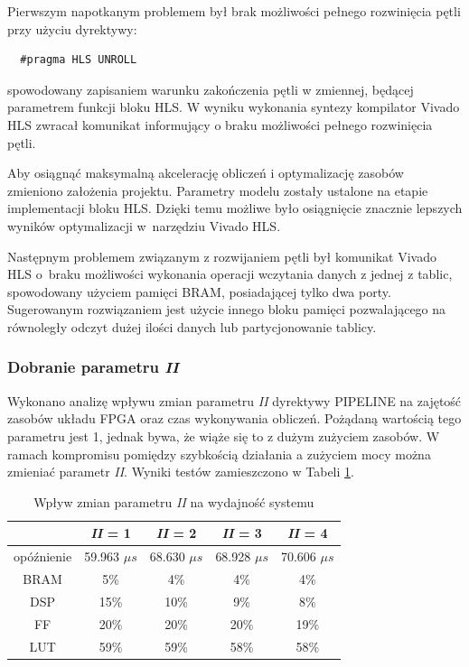 Pierwszym napotkanym problemem był brak możliwości pełnego rozwinięcia pętli przy użyciu dyrektywy:
\begin{verbatim}
  #pragma HLS UNROLL
\end{verbatim}
spowodowany zapisaniem warunku zakończenia pętli w zmiennej, będącej parametrem funkcji bloku HLS. 
W wyniku wykonania syntezy kompilator Vivado HLS zwracał komunikat informujący o braku możliwości pełnego rozwinięcia pętli.

Aby osiągnąć maksymalną akcelerację obliczeń i optymalizację zasobów zmieniono założenia projektu. Parametry modelu zostały ustalone na etapie implementacji bloku HLS. Dzięki temu możliwe było osiągnięcie znacznie lepszych wyników optymalizacji w~narzędziu Vivado HLS.

Następnym problemem związanym z rozwijaniem pętli był komunikat Vivado HLS o~braku możliwości wykonania operacji wczytania danych z jednej z tablic, spowodowany użyciem pamięci BRAM, posiadającej tylko dwa porty. Sugerowanym rozwiązaniem jest użycie innego bloku pamięci pozwalającego na równoległy odczyt dużej ilości danych lub partycjonowanie tablicy.

\subsubsection{Dobranie parametru \emph{II}}

Wykonano analizę wpływu zmian parametru \emph{II} dyrektywy PIPELINE na zajętość zasobów układu FPGA oraz czas wykonywania obliczeń. Pożądaną wartością tego parametru jest 1, jednak bywa, że wiąże się to z dużym zużyciem zasobów. W ramach kompromisu pomiędzy szybkością działania a zużyciem mocy można zmieniać parametr \emph{II}. Wyniki testów zamieszczono w Tabeli \ref{tab:ii-relu}.

\begin{table}[h] \centering
  \caption{Wpływ zmian parametru \emph{II} na wydajność systemu}
  \centering
  \begin{tabular} {c|c|c|c|c} \hline \label{tab:ii-relu}  

                  & \emph{II} = 1   & \emph{II} = 2   & \emph{II} = 3   & \emph{II} = 4   \\\hline
    opóźnienie    & 59.963  $\mu s$ & 68.630 $\mu s$  & 68.928 $\mu s$  & 70.606 $\mu s$  \\
    BRAM          & 5\%             & 4\%             & 4\%             & 4\%             \\
    DSP           & 15\%            & 10\%            & 9\%             & 8\%             \\
    FF            & 20\%            & 20\%            & 20\%            & 19\%            \\
    LUT           & 59\%            & 59\%            & 58\%            & 58\%            \\
  \end{tabular}
\end{table}



